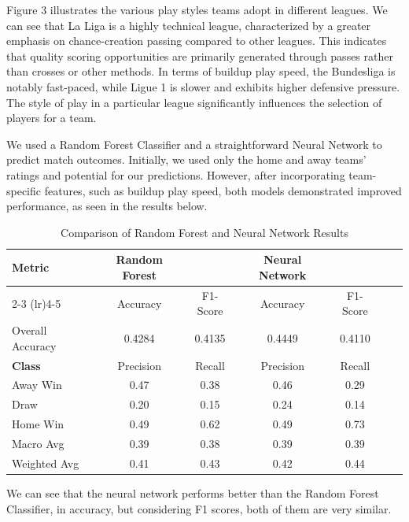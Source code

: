 \documentclass{article}
\begin{document}
Figure 3 illustrates the various play styles teams adopt in different leagues. We can see that La Liga is a highly technical league, characterized by a greater emphasis on chance-creation passing compared to other leagues. This indicates that quality scoring opportunities are primarily generated through passes rather than crosses or other methods. In terms of buildup play speed, the Bundesliga is notably fast-paced, while Ligue 1 is slower and exhibits higher defensive pressure. The style of play in a particular league significantly influences the selection of players for a team.

We used a Random Forest Classifier and a straightforward Neural Network to predict match outcomes. Initially, we used only the home and away teams' ratings and potential for our predictions. However, after incorporating team-specific features, such as buildup play speed, both models demonstrated improved performance, as seen in the results below.

\begin{table}[htbp]
    \centering
    \caption{Comparison of Random Forest and Neural Network Results}
    \begin{tabular}{@{}lcccccc@{}}
        \toprule
        \textbf{Metric} & \textbf{Random Forest} & & \textbf{Neural Network} & \\
        \cmidrule(lr){2-3} \cmidrule(lr){4-5}
        & Accuracy & F1-Score & Accuracy & F1-Score \\
        \midrule
        Overall Accuracy & 0.4284 & 0.4135 & 0.4449 & 0.4110 \\
        \midrule
        \textbf{Class} & Precision & Recall & Precision & Recall \\
        \midrule
        Away Win & 0.47 & 0.38 & 0.46 & 0.29 \\
        Draw & 0.20 & 0.15 & 0.24 & 0.14 \\
        Home Win & 0.49 & 0.62 & 0.49 & 0.73 \\
        \midrule
        Macro Avg & 0.39 & 0.38 & 0.39 & 0.39 \\
        Weighted Avg & 0.41 & 0.43 & 0.42 & 0.44 \\
        \bottomrule
    \end{tabular}
    \label{tab:model_comparison}
\end{table}
We can see that the neural network performs better than the Random Forest Classifier, in accuracy, but considering F1 scores, both of them are very similar.
\end{document}
